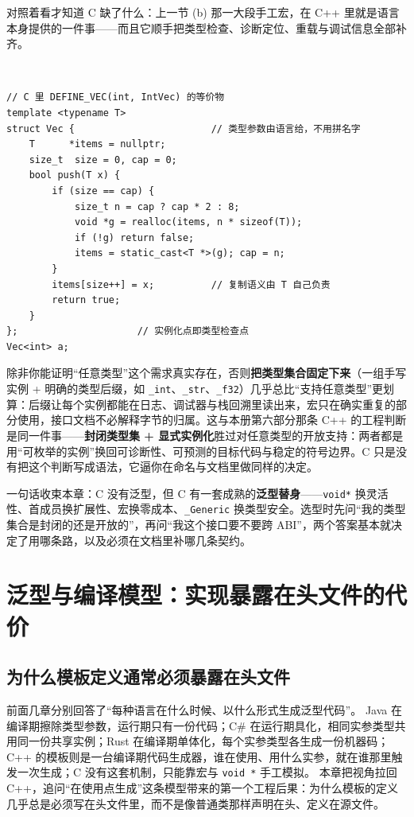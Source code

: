\documentclass[12pt,a4paper,fontset=fandol]{ctexbook}
\newcommand{\cpplabel}{%
  \tcbox[on line,colback=cppheadbg,colframe=cppheadbg,
    boxrule=0pt,arc=1pt,left=2pt,right=2pt,top=1pt,bottom=1pt,
    colupper=white,fontupper=\scriptsize\bfseries]{C++}}
\newcommand{\cpp}[1]{C++#1}
\newcommand{\kw}[1]{\texttt{#1}}
\begin{document}
对照着看才知道 C 缺了什么：上一节 (b) 那一大段手工宏，在 \cpp{} 里就是语言本身提供的一件事——而且它顺手把类型检查、诊断定位、重载与调试信息全部补齐。

\cpplabel\ \begin{lstlisting}[style=cppstyle,caption={C 的手工宏在 \cpp{} 里由模板自动化并获得类型检查}]
// C 里 DEFINE_VEC(int, IntVec) 的等价物
template <typename T>
struct Vec {                        // 类型参数由语言给，不用拼名字
    T      *items = nullptr;
    size_t  size = 0, cap = 0;
    bool push(T x) {
        if (size == cap) {
            size_t n = cap ? cap * 2 : 8;
            void *g = realloc(items, n * sizeof(T));
            if (!g) return false;
            items = static_cast<T *>(g); cap = n;
        }
        items[size++] = x;          // 复制语义由 T 自己负责
        return true;
    }
};                     // 实例化点即类型检查点
Vec<int> a;
\end{lstlisting}

\begin{bestpractice}[title={在 C 里做“泛型”，先固定类型集合}]
除非你能证明“任意类型”这个需求真实存在，否则\textbf{把类型集合固定下来}（一组手写实例 + 明确的类型后缀，如 \kw{\_int}、\kw{\_str}、\kw{\_f32}）几乎总比“支持任意类型”更划算：后缀让每个实例都能在日志、调试器与栈回溯里读出来，宏只在确实重复的部分使用，接口文档不必解释字节的归属。这与本册第六部分那条 \cpp{} 的工程判断是同一件事——\textbf{封闭类型集 + 显式实例化}胜过对任意类型的开放支持：两者都是用“可枚举的实例”换回可诊断性、可预测的目标代码与稳定的符号边界。C 只是没有把这个判断写成语法，它逼你在命名与文档里做同样的决定。
\end{bestpractice}

一句话收束本章：C 没有泛型，但 C 有一套成熟的\textbf{泛型替身}——\kw{void*} 换灵活性、首成员换扩展性、宏换零成本、\kw{\_Generic} 换类型安全。选型时先问“我的类型集合是封闭的还是开放的”，再问“我这个接口要不要跨 ABI”，两个答案基本就决定了用哪条路，以及必须在文档里补哪几条契约。

\part{泛型与编译模型：实现暴露在头文件的代价}

\chapter{为什么模板定义通常必须暴露在头文件}

前面几章分别回答了“每种语言在什么时候、以什么形式生成泛型代码”。
Java 在编译期擦除类型参数，运行期只有一份代码；C\# 在运行期具化，相同实参类型共用同一份共享实例；Rust 在编译期单体化，每个实参类型各生成一份机器码；\cpp{} 的模板则是一台编译期代码生成器，谁在使用、用什么实参，就在谁那里触发一次生成；C 没有这套机制，只能靠宏与 \kw{void *} 手工模拟。
本章把视角拉回 \cpp{}，追问“在使用点生成”这条模型带来的第一个工程后果：为什么模板的定义几乎总是必须写在头文件里，而不是像普通类那样声明在头、定义在源文件。
\end{document}
